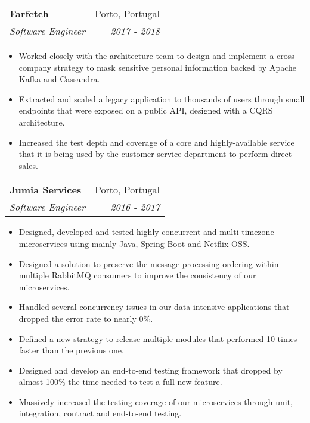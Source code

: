 \documentclass[letterpaper,11pt]{article}
\makeatletter
\newcommand{\resumeItem}[2]{
  \item\small{
    \textbf{#1}{#2 \vspace{-2pt}}
  }
}
\newcommand{\resumeSubheading}[4]{
  \vspace{-1pt}\item
    \begin{tabular*}{0.97\textwidth}{l@{\extracolsep{\fill}}r}
      \textbf{#1} & #2 \\
      \textit{\small#3} & \textit{\small #4} \\
    \end{tabular*}\vspace{-5pt}
}
\newcommand{\resumeItemListStart}{\begin{itemize}}
\newcommand{\resumeItemListEnd}{\end{itemize}\vspace{-5pt}}
\makeatother
\begin{document}
    \resumeSubheading
      {Farfetch}{Porto, Portugal}
      {Software Engineer}{2017 - 2018}
      \resumeItemListStart
        \resumeItem{}{Worked closely with the architecture team to design and implement
        a cross-company strategy to mask sensitive personal information backed by Apache Kafka and Cassandra.}
        \resumeItem{}{Extracted and scaled a legacy application to thousands of users
        through small endpoints that were exposed on a public API, designed with a CQRS architecture.}
        \resumeItem{}{Increased the test depth and coverage of a core and highly-available service that
        it is being used by the customer service department to perform direct sales.}
      \resumeItemListEnd

    \resumeSubheading
      {Jumia Services}{Porto, Portugal}
      {Software Engineer}{2016 - 2017}
      \resumeItemListStart
        \resumeItem{}{Designed, developed and tested highly concurrent and multi-timezone
        microservices using mainly Java, Spring Boot and Netflix OSS.}
        \resumeItem{}{Designed a solution to preserve the message processing ordering within
        multiple RabbitMQ consumers to improve the consistency of our microservices.}
        \resumeItem{}{Handled several concurrency issues in our data-intensive applications
        that dropped the error rate to nearly 0\%.}
        \resumeItem{}{Defined a new strategy to release multiple modules that performed 10
        times faster than the previous one.}
        \resumeItem{}{Designed and develop an end-to-end testing framework that dropped by
        almost 100\% the time needed to test a full new feature.}
        \resumeItem{}{Massively increased the testing coverage of our microservices through
        unit, integration, contract and end-to-end testing.}
      \resumeItemListEnd


\end{document}
